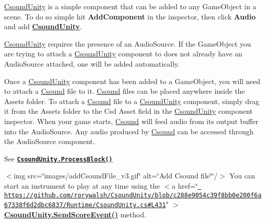 \mbox{\hyperlink{class_csound_unity}{Csound\+Unity}} is a simple component that can be added to any Game\+Object in a scene. To do so simple hit {\bfseries{Add\+Component}} in the inspector, then click {\bfseries{Audio}} and add {\bfseries{\mbox{\hyperlink{class_csound_unity}{Csound\+Unity}}}}.



\mbox{\hyperlink{class_csound_unity}{Csound\+Unity}} requires the presence of an Audio\+Source. If the Game\+Object you are trying to attach a \mbox{\hyperlink{class_csound_unity}{Csound\+Unity}} component to does not already have an Audio\+Source attached, one will be added automatically.

Once a \mbox{\hyperlink{class_csound_unity}{Csound\+Unity}} component has been added to a Game\+Object, you will need to attach a \mbox{\hyperlink{namespace_csound}{Csound}} file to it. \mbox{\hyperlink{namespace_csound}{Csound}} files can be placed anywhere inside the Assets folder. To attach a \mbox{\hyperlink{namespace_csound}{Csound}} file to a \mbox{\hyperlink{class_csound_unity}{Csound\+Unity}} component, simply drag it from the Assets folder to the \textquotesingle{}Csd Asset\textquotesingle{} field in the \mbox{\hyperlink{class_csound_unity}{Csound\+Unity}} component inspector. When your game starts, \mbox{\hyperlink{namespace_csound}{Csound}} will feed audio from its output buffer into the Audio\+Source. Any audio produced by \mbox{\hyperlink{namespace_csound}{Csound}} can be accessed through the Audio\+Source component.

See \href{https://github.com/rorywalsh/CsoundUnity/blob/c288e9054c39f8bb0e200f6a67338f6d2dbc6837/Runtime/CsoundUnity.cs\#L1414}{\texttt{ {\bfseries{Csound\+Unity.\+Process\+Block()}}}}

\texorpdfstring{$<$}{<}img src=\char`\"{}images/add\+Csound\+File\+\_\+v3.\+gif\char`\"{} alt=\char`\"{}\+Add Csound file\char`\"{}\char`\"{}/$>$   \+You can start an instrument to play at any time using the $<$a href=\char`\"{}\href{https://github.com/rorywalsh/CsoundUnity/blob/c288e9054c39f8bb0e200f6a67338f6d2dbc6837/Runtime/CsoundUnity.cs\#L431}{\texttt{ https\+://github.\+com/rorywalsh/\+Csound\+Unity/blob/c288e9054c39f8bb0e200f6a67338f6d2dbc6837/\+Runtime/\+Csound\+Unity.\+cs\#\+L431}}"{} \texorpdfstring{$>$}{>}{\bfseries{\mbox{\hyperlink{class_csound_unity_a67eb0ef59ebe2b06a17cbfe362d03122}{Csound\+Unity.\+Send\+Score\+Event()}}}} method. 